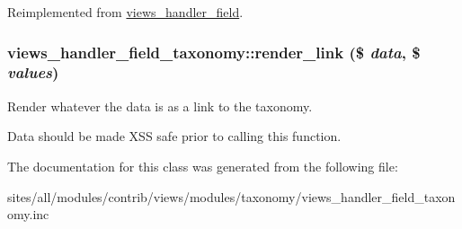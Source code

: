 Reimplemented from \hyperlink{classviews__handler__field_82ff951c5e9ceb97b2eab86f880cbc1e}{views\_\-handler\_\-field}.\hypertarget{classviews__handler__field__taxonomy_eeaf9833824a87e8fe2717880dc389af}{
\subsubsection[{render\_\-link}]{\setlength{\rightskip}{0pt plus 5cm}views\_\-handler\_\-field\_\-taxonomy::render\_\-link (\$ {\em data}, \/  \$ {\em values})}}
\label{classviews__handler__field__taxonomy_eeaf9833824a87e8fe2717880dc389af}


Render whatever the data is as a link to the taxonomy.

Data should be made XSS safe prior to calling this function. 

The documentation for this class was generated from the following file:\begin{CompactItemize}
\item 
sites/all/modules/contrib/views/modules/taxonomy/views\_\-handler\_\-field\_\-taxonomy.inc\end{CompactItemize}
